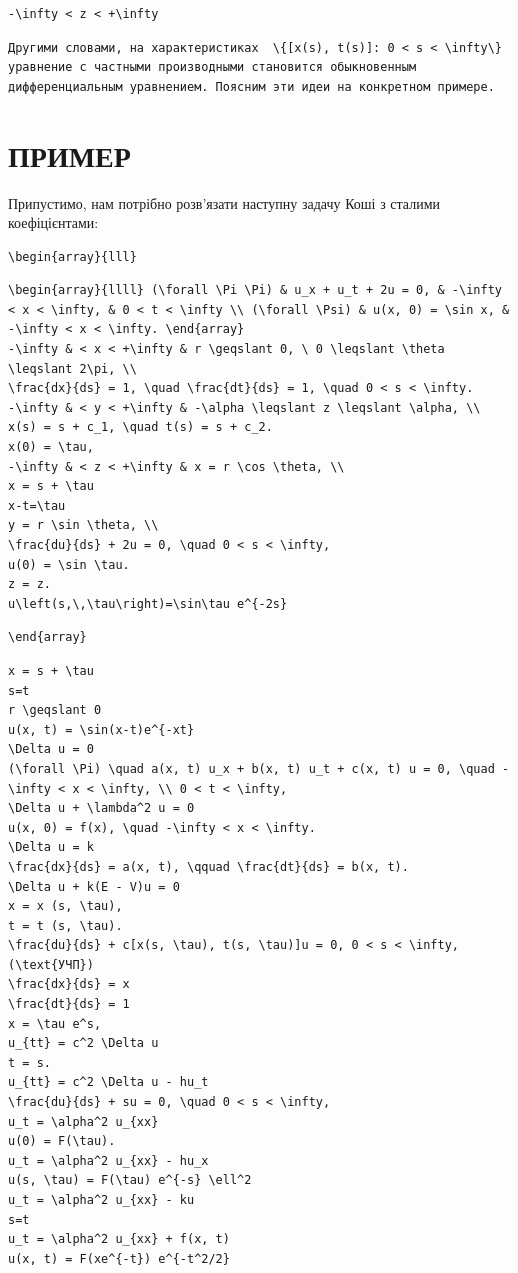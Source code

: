 \documentclass[
  ukrainian,
]{article}
\begin{document}
\begin{verbatim}
-\infty < z < +\infty
\end{verbatim}

\begin{verbatim}
Другими словами, на характеристиках  \{[x(s), t(s)]: 0 < s < \infty\}  уравнение с частными производными становится обыкновенным дифференциальным уравнением. Поясним эти идеи на конкретном примере.
\end{verbatim}

\section{ПРИМЕР}\label{ux43fux440ux438ux43cux435ux440}

Припустимо, нам потрібно розв'язати наступну задачу Коші з сталими
коефіцієнтами:

\begin{verbatim}
\begin{array}{lll}
\end{verbatim}

\begin{verbatim}
\begin{array}{llll} (\forall \Pi \Pi) & u_x + u_t + 2u = 0, & -\infty < x < \infty, & 0 < t < \infty \\ (\forall \Psi) & u(x, 0) = \sin x, & -\infty < x < \infty. \end{array}
-\infty & < x < +\infty & r \geqslant 0, \ 0 \leqslant \theta \leqslant 2\pi, \\
\frac{dx}{ds} = 1, \quad \frac{dt}{ds} = 1, \quad 0 < s < \infty.
-\infty & < y < +\infty & -\alpha \leqslant z \leqslant \alpha, \\
x(s) = s + c_1, \quad t(s) = s + c_2.
x(0) = \tau,
-\infty & < z < +\infty & x = r \cos \theta, \\
x = s + \tau
x-t=\tau
y = r \sin \theta, \\
\frac{du}{ds} + 2u = 0, \quad 0 < s < \infty,
u(0) = \sin \tau.
z = z.
u\left(s,\,\tau\right)=\sin\tau e^{-2s}
\end{verbatim}

\begin{verbatim}
\end{array}
\end{verbatim}

\begin{verbatim}
x = s + \tau
s=t
r \geqslant 0
u(x, t) = \sin(x-t)e^{-xt}
\Delta u = 0
(\forall \Pi) \quad a(x, t) u_x + b(x, t) u_t + c(x, t) u = 0, \quad -\infty < x < \infty, \\ 0 < t < \infty,
\Delta u + \lambda^2 u = 0
u(x, 0) = f(x), \quad -\infty < x < \infty.
\Delta u = k
\frac{dx}{ds} = a(x, t), \qquad \frac{dt}{ds} = b(x, t).
\Delta u + k(E - V)u = 0
x = x (s, \tau),
t = t (s, \tau).
\frac{du}{ds} + c[x(s, \tau), t(s, \tau)]u = 0, 0 < s < \infty,
(\text{УЧП})
\frac{dx}{ds} = x
\frac{dt}{ds} = 1
x = \tau e^s,
u_{tt} = c^2 \Delta u
t = s.
u_{tt} = c^2 \Delta u - hu_t
\frac{du}{ds} + su = 0, \quad 0 < s < \infty,
u_t = \alpha^2 u_{xx}
u(0) = F(\tau).
u_t = \alpha^2 u_{xx} - hu_x
u(s, \tau) = F(\tau) e^{-s} \ell^2
u_t = \alpha^2 u_{xx} - ku
s=t
u_t = \alpha^2 u_{xx} + f(x, t)
u(x, t) = F(xe^{-t}) e^{-t^2/2}
\end{verbatim}
\end{document}
